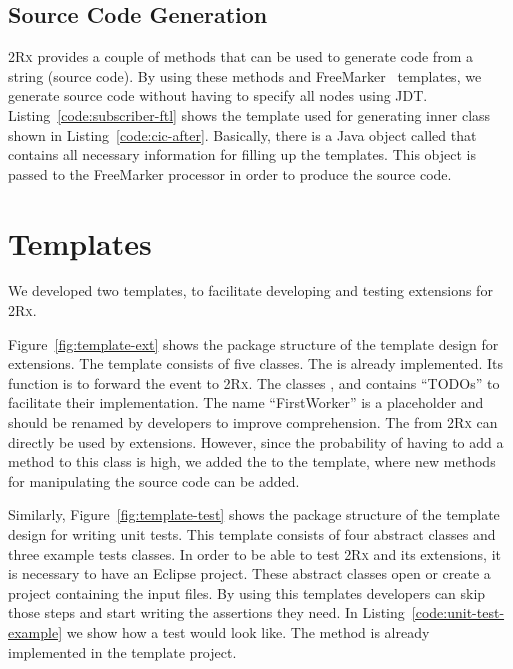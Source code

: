 \documentclass[type=bsc,accentcolor=tud9c]{tudthesis}
\newcommand{\framework}[1]{\textcolor{black!65}{#1}}
\newcommand{\toolcore}{\textsc{2Rx}}
\begin{document}


\subsection{Source Code Generation}
\toolcore{} provides a couple of methods that can be used to generate code from a string (source code). By using these methods and \framework{FreeMarker}~\cite{freeMarker} templates, we generate source code without having to specify all nodes using JDT. Listing~\ref{code:subscriber-ftl} shows the template used for generating inner class  shown in Listing~\ref{code:cic-after}. Basically, there is a \framework{Java} object called  that contains all necessary information for filling up the templates. This object is passed to the \framework{FreeMarker} processor in order to produce the source code.



\section{Templates}
We developed two templates, to facilitate developing and testing extensions for \toolcore{}.

Figure~\ref{fig:template-ext} shows the package structure of the template design for extensions. The template consists of five classes. The  is already implemented. Its function is to forward the event to \toolcore{}. The classes ,  and  contains ``TODOs'' to facilitate their implementation. The name ``FirstWorker'' is a placeholder and should be renamed by developers to improve comprehension. The  from \toolcore{} can directly be used by extensions. However, since the probability of having to add a method to this class is high, we added the  to the template, where new methods for manipulating the source code can be added.

Similarly, Figure~\ref{fig:template-test} shows the package structure of the template design for writing unit tests. This template consists of four abstract classes and three example tests classes. In order to be able to test \toolcore{} and its extensions, it is necessary to have an Eclipse project. These abstract classes open or create a project containing the input files. By using this templates developers can skip those steps and start writing the assertions they need. In Listing~\ref{code:unit-test-example} we show how a test would look like. The method  is already implemented in the template project.
\end{document}
